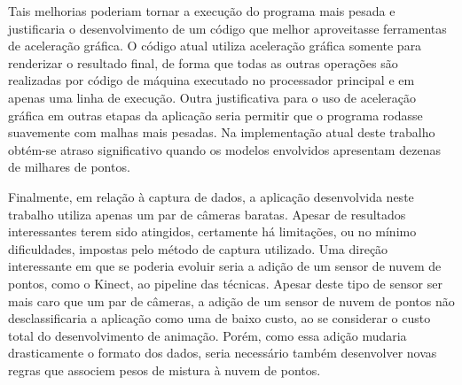Tais melhorias poderiam tornar a execução do programa mais pesada e justificaria o desenvolvimento de um código que melhor aproveitasse ferramentas de aceleração gráfica. O código atual utiliza aceleração gráfica somente para renderizar o resultado final, de forma que todas as outras operações são realizadas por código  de máquina executado no processador principal  e em apenas uma linha de execução. Outra justificativa para o uso de aceleração gráfica em outras etapas da aplicação seria permitir que o programa rodasse suavemente com malhas mais pesadas. Na implementação atual deste trabalho obtém-se atraso significativo quando os modelos envolvidos apresentam dezenas de milhares de pontos.

Finalmente, em relação à captura de dados, a aplicação desenvolvida neste trabalho utiliza apenas um par de câmeras baratas. Apesar de resultados interessantes terem sido atingidos, certamente há limitações, ou no mínimo dificuldades, impostas pelo método de captura utilizado. 
Uma direção interessante em que se poderia evoluir seria a adição de um sensor de nuvem de pontos, como o Kinect, ao pipeline das técnicas. Apesar deste tipo de sensor ser mais caro que um par de câmeras, a adição de um sensor de nuvem de pontos não desclassificaria a aplicação como uma de baixo custo, ao se considerar o custo total do desenvolvimento de animação. Porém, como essa adição mudaria drasticamente o formato dos dados, seria necessário também desenvolver novas regras que associem pesos de mistura à nuvem de pontos.








